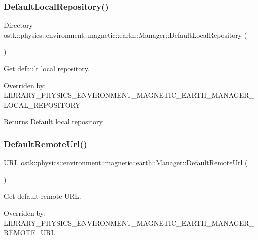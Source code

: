 \subsubsection{\texorpdfstring{Default\+Local\+Repository()}{DefaultLocalRepository()}}
{\footnotesize\ttfamily Directory ostk\+::physics\+::environment\+::magnetic\+::earth\+::\+Manager\+::\+Default\+Local\+Repository (\begin{DoxyParamCaption}{ }\end{DoxyParamCaption})\hspace{0.3cm}{\ttfamily [static]}}



Get default local repository. 

Overriden by\+: L\+I\+B\+R\+A\+R\+Y\+\_\+\+P\+H\+Y\+S\+I\+C\+S\+\_\+\+E\+N\+V\+I\+R\+O\+N\+M\+E\+N\+T\+\_\+\+M\+A\+G\+N\+E\+T\+I\+C\+\_\+\+E\+A\+R\+T\+H\+\_\+\+M\+A\+N\+A\+G\+E\+R\+\_\+\+L\+O\+C\+A\+L\+\_\+\+R\+E\+P\+O\+S\+I\+T\+O\+RY

\begin{DoxyReturn}{Returns}
Default local repository 
\end{DoxyReturn}
\mbox{\label{classostk_1_1physics_1_1environment_1_1magnetic_1_1earth_1_1_manager_aedefa57c3b45cd22a7aca9e5b08fe71f}} 
\subsubsection{\texorpdfstring{Default\+Remote\+Url()}{DefaultRemoteUrl()}}
{\footnotesize\ttfamily U\+RL ostk\+::physics\+::environment\+::magnetic\+::earth\+::\+Manager\+::\+Default\+Remote\+Url (\begin{DoxyParamCaption}{ }\end{DoxyParamCaption})\hspace{0.3cm}{\ttfamily [static]}}



Get default remote U\+RL. 

Overriden by\+: L\+I\+B\+R\+A\+R\+Y\+\_\+\+P\+H\+Y\+S\+I\+C\+S\+\_\+\+E\+N\+V\+I\+R\+O\+N\+M\+E\+N\+T\+\_\+\+M\+A\+G\+N\+E\+T\+I\+C\+\_\+\+E\+A\+R\+T\+H\+\_\+\+M\+A\+N\+A\+G\+E\+R\+\_\+\+R\+E\+M\+O\+T\+E\+\_\+\+U\+RL


